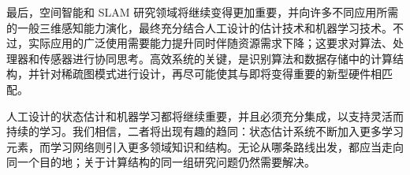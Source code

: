 最后，空间智能和 SLAM 研究领域将继续变得更加重要，并向许多不同应用所需的一般三维感知能力演化，最终充分结合人工设计的估计技术和机器学习技术。不过，实际应用的广泛使用需要能力提升同时伴随资源需求下降；这要求对算法、处理器和传感器进行协同思考。高效系统的关键，是识别算法和数据存储中的计算结构，并针对稀疏图模式进行设计，再尽可能使其与即将变得重要的新型硬件相匹配。

人工设计的状态估计和机器学习都将继续重要，并且必须充分集成，以支持灵活而持续的学习。我们相信，二者将出现有趣的趋同：状态估计系统不断加入更多学习元素，而学习网络则引入更多领域知识和结构。无论从哪条路线出发，都应当走向同一个目的地；关于计算结构的同一组研究问题仍然需要解决。
